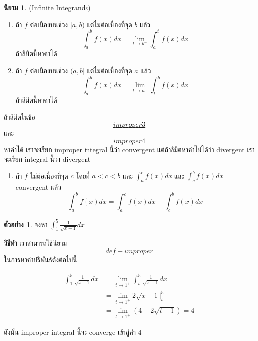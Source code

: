\documentclass[
]{book}
\providecommand{\tightlist}{%
  \setlength{\itemsep}{0pt}\setlength{\parskip}{0pt}}
\theoremstyle{definition}
\newtheorem{definition}{นิยาม}[chapter]
\theoremstyle{definition}
\newtheorem{example}{ตัวอย่าง}[chapter]
\theoremstyle{definition}
\theoremstyle{definition}
\theoremstyle{remark}
\begin{document}
\begin{definition}

\label{def-improper}{} (Infinite Integrands)

\begin{enumerate}
\def\labelenumi{\arabic{enumi}.}
\item
  \label{improper3}{} ถ้า \(f\) ต่อเนื่องบนช่วง \([a,b)\)
  แต่ไม่ต่อเนื่องที่จุด \(b\) แล้ว
  \[\int_{a}^b f(x) dx = \lim_{t \rightarrow b^{-}} \int_{a}^t f(x) dx\]
  ถ้าลิมิตนี้หาค่าได้
\item
  \label{improper4}{} ถ้า \(f\) ต่อเนื่องบนช่วง \((a,b]\)
  แต่ไม่ต่อเนื่องที่จุด \(a\) แล้ว
  \[\int_{a}^b f(x) dx = \lim_{t \rightarrow a^{+}} \int_{t}^b f(x) dx\]
  ถ้าลิมิตนี้หาค่าได้
\end{enumerate}

ถ้าลิมิตในข้อ \hyperref[improper3]{\[improper3\]} และ
\hyperref[improper4]{\[improper4\]}
หาค่าได้ เราจะเรียก improper integral นี้ว่า convergent แต่ถ้าลิมิตหาค่าไม่ได้ว่า
divergent เราจะเรียก integral นี้ว่า divergent

\begin{enumerate}
\def\labelenumi{\arabic{enumi}.}
\setcounter{enumi}{2}
\tightlist
\item
  ถ้า \(f\) ไม่ต่อเนื่องที่จุด \(c\) โดยที่ \(a < c <b\) และ \(\int_{a}^{c} f(x) dx\)
  และ \(\int_{c}^{b} f(x) dx\) convergent แล้ว \[\int_{a}^{b} f(x) dx  = 
                \int_{a}^{c} f(x) dx + \int_{c}^{b} f(x) dx\]
\end{enumerate}

\end{definition}

\begin{example}
จงหา \(\int_{1}^{5} \frac{1}{\sqrt{x-1}} dx\)
\end{example}

\textbf{วิธีทำ} เราสามารถใช้นิยาม
\hyperref[def-improper]{\[def-improper\]} ในการหาค่าปริพันธ์ดังต่อไปนี้  

\[\begin{aligned}
  \int_{1}^{5} \frac{1}{\sqrt{x-1}} dx &= \lim_{t \rightarrow 1^{+} }\int_{t}^{5} \frac{1}{\sqrt{x-1}} dx \\
         &= \lim_{t \rightarrow 1^{+}} 2\sqrt{x-1} |_{t}^{5} \\
         &= \lim_{t \rightarrow 1^{+}} (4 - 2\sqrt{t-1}) = 4               
\end{aligned}\]

  ดังนั้น improper integral นี้จะ converge เข้าสู่ค่า 4
\end{document}
